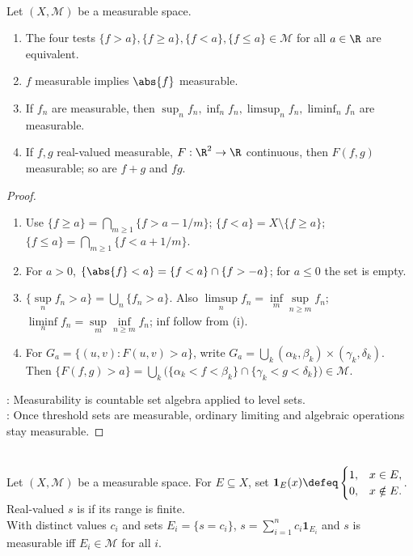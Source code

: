 \begin{theorem} \label{thm:measurable-function-closure} \\
Let $(X,\mathcal{M})$ be a measurable space.
\begin{enumerate}[label=(\roman*)]
\setlength{\itemsep}{0pt}
\item The four tests $\{f>a\},\{f\geq a\},\{f<a\},\{f\leq a\}\in\mathcal{M}$ for all $a\in\R$ are equivalent.
\item $f$ measurable implies $\abs{f}$ measurable.
\item If $f_n$ are measurable, then $\sup_nf_n,\inf_nf_n,\limsup_nf_n,\liminf_nf_n$ are measurable.
\item If $f,g$ real-valued measurable, $F:\R^2\to\R$ continuous, then $F(f,g)$ measurable; so are $f+g$ and $fg$.
\end{enumerate}
\begin{proof}
\begin{enumerate}[label=(\roman*)]
\setlength{\itemsep}{0pt}
\item Use $\{f\geq a\}=\bigcap\limits_{m\geq1}\{f>a-1/m\}$; $\{f<a\}=X\setminus\{f\geq a\}$; $\{f\leq a\}=\bigcap\limits_{m\geq1}\{f<a+1/m\}$.
\item For $a>0$, $\{\abs{f}<a\}=\{f<a\}\cap\{f>-a\}$; for $a\leq0$ the set is empty.
\item $\{\sup\limits_nf_n>a\}=\bigcup\limits_n\{f_n>a\}$. Also $\limsup\limits_nf_n=\inf\limits_m\sup\limits_{n\geq m}f_n$; $\liminf\limits_nf_n=\sup\limits_m\inf\limits_{n\geq m}f_n$; inf follow from (i).
\item For $G_a=\{(u,v):F(u,v)>a\}$, write $G_a=\bigcup\limits_k(\alpha_k,\beta_k)\times(\gamma_k,\delta_k)$.\\
Then $\{F(f,g)>a\}=\bigcup\limits_k\bigl(\{\alpha_k<f<\beta_k\}\cap\{\gamma_k<g<\delta_k\}\bigr)\in\mathcal{M}$.
\end{enumerate}
: Measurability is countable set algebra applied to level sets.\\
: Once threshold sets are measurable, ordinary limiting and algebraic operations stay measurable.
\end{proof}
\end{theorem}

\begin{definition} \label{def:simple-functions-measurable} \\
Let $(X,\mathcal{M})$ be a measurable space. For $E\subseteq X$, set $\mathbf{1}_E(x)\defeq
\begin{cases}
1,&x\in E,\\
0,&x\notin E.
\end{cases}$. Real-valued $s$ is  if its range is finite.\\
With distinct values $c_i$ and sets $E_i=\{s=c_i\}$, $s=\sum\limits_{i=1}^{n}c_i\mathbf{1}_{E_i}$ and $s$ is measurable iff $E_i\in\mathcal{M}$ for all $i$.
\end{definition}

